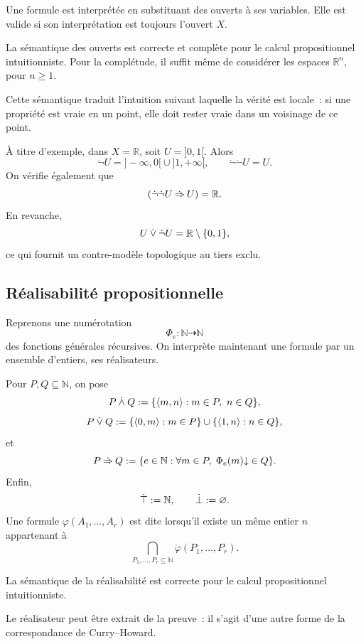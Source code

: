 Une formule est interprétée en substituant des ouverts à ses variables.
Elle est valide si son interprétation est toujours l'ouvert $X$.

\begin{thm}[Tarski]
La sémantique des ouverts est correcte et complète pour le calcul
propositionnel intuitionniste. Pour la complétude, il suffit même de
considérer les espaces $\mathbb{R}^n$, pour $n\geq1$.
\end{thm}

Cette sémantique traduit l'intuition suivant laquelle la vérité est
locale : si une propriété est vraie en un point, elle doit rester vraie
dans un voisinage de ce point.

\thingy À titre d'exemple, dans $X=\mathbb{R}$, soit
$U={]0,1[}$. Alors
\[
\dot{\neg}U
 ={]-\infty,0[}\cup{]1,+\infty[},
\qquad
\dot{\neg}\dot{\neg}U=U.
\]
On vérifie également que
\[
(\dot{\neg}\dot{\neg}U\mathbin{\mathbin{\dot\Rightarrow}}U)=\mathbb{R}.
\]
En revanche,
\[
U\mathbin{\mathbin{\dot\lor}}\dot{\neg}U
 =\mathbb{R}\setminus\{0,1\},
\]
ce qui fournit un contre-modèle topologique au tiers exclu.

\subsection{Réalisabilité propositionnelle}

\thingy Reprenons une numérotation
\[
\Phi_e:\mathbb{N}\dashrightarrow\mathbb{N}
\]
des fonctions générales récursives. On interprète maintenant une
formule par un ensemble d'entiers, ses réalisateurs.

Pour $P,Q\subseteq\mathbb{N}$, on pose
\[
P\mathbin{\mathbin{\dot\land}}Q
 :=\{\langle m,n\rangle:m\in P,\ n\in Q\},
\]
\[
P\mathbin{\mathbin{\dot\lor}}Q
 :=\{\langle0,m\rangle:m\in P\}
   \cup\{\langle1,n\rangle:n\in Q\},
\]
et
\[
P\mathbin{\mathbin{\dot\Rightarrow}}Q
 :=\{e\in\mathbb{N}:
     \forall m\in P,\;
     \Phi_e(m)\mathord{\downarrow}\in Q\}.
\]
Enfin,
\[
\mathord{\dot\top}:=\mathbb{N},
\qquad
\mathord{\dot\bot}:=\varnothing.
\]
Une formule $\varphi(A_1,\ldots,A_r)$ est dite
 lorsqu'il existe un même entier $n$ appartenant à
\[
\bigcap_{P_1,\ldots,P_r\subseteq\mathbb{N}}
\dot{\varphi}(P_1,\ldots,P_r).
\]

\begin{thm}
La sémantique de la réalisabilité est correcte pour le calcul
propositionnel intuitionniste.
\end{thm}

Le réalisateur peut être extrait de la preuve : il s'agit d'une autre
forme de la correspondance de Curry--Howard.

